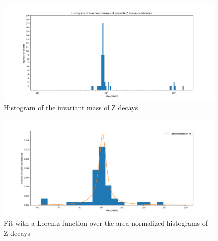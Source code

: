 \documentclass[a4paper,10pt]{article}
\begin{document}
\begin{figure}[H]
\centering
\includegraphics[width =.8\textwidth]{img/Zboson}
\caption{Histogram of the invariant mass of Z decays}\label{Zhistogram}
\end{figure}
\begin{figure}[H]
\centering
\includegraphics[width =.8\textwidth]{img/Zfit}
\caption{Fit with a Lorentz function over the area normalized histograms of Z decays}\label{fit}
\end{figure}
\end{document}

